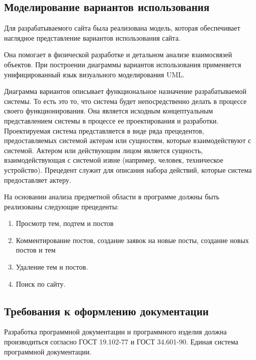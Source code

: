 \subsection{Моделирование вариантов использования}

Для разрабатываемого сайта была реализована модель, которая обеспечивает наглядное представление вариантов использования сайта.

Она помогает в физической разработке и детальном анализе взаимосвязей объектов. При построении диаграммы вариантов использования применяется унифицированный язык визуального моделирования UML.

Диаграмма вариантов описывает функциональное назначение разрабатываемой системы. То есть это то, что система будет непосредственно делать в процессе своего функционирования. Она является исходным концептуальным представлением системы в процессе ее проектирования и разработки. Проектируемая система представляется в виде ряда прецедентов, предоставляемых системой актерам или сущностям, которые взаимодействуют с системой. Актером или действующим лицом является сущность, взаимодействующая с системой извне (например, человек, техническое устройство). Прецедент служит для описания набора действий, которые система предоставляет актеру.

На основании анализа предметной области в программе должны быть реализованы следующие прецеденты:
\begin{enumerate}
\item Просмотр тем, подтем и постов
\item Комментирование постов, создание заявок на новые посты, создание новых постов и тем
\item Удаление тем и постов.
\item Поиск по сайту.
\end{enumerate}

\subsection{Требования к оформлению документации}

Разработка программной документации и программного изделия должна производиться согласно ГОСТ 19.102-77 и ГОСТ 34.601-90. Единая система программной документации.
